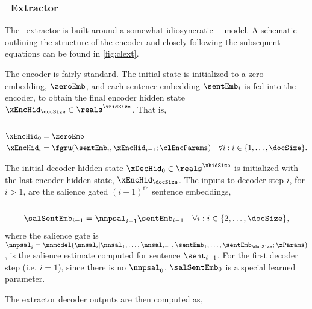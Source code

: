 

\subsubsection{\clext~Extractor}

The \clext~extractor \citep{cheng2016neural} is built around a somewhat
idiosyncratic \unidirectional~\sequencetosequence~model. A schematic outlining
the structure of the encoder and closely following the subsequent equations can
be found in \autoref{fig:clext}.

The encoder is fairly standard. The initial state is initialized to a zero
embedding, $\zeroEmb$, and each sentence embedding $\sentEmb_i$ is fed into the
encoder, to obtain the final encoder hidden state $\xEncHid_\docSize \in
\reals^\xhidSize$. That is,\\

\noindent{}\\[-40pt]
\begin{align}
    \xEncHid_0 & = \zeroEmb \\
    \xEncHid_i &= \fgru(\sentEmb_i, \xEncHid_{i-1};\clEncParams) & 
    \forall i : i \in \{1,\ldots,\docSize\}. 
\end{align}

The initial decoder hidden state $\xDecHid_0 \in \reals^{\xhidSize}$ is
initialized with the last encoder hidden state, $\xEncHid_\docSize$.  The
inputs to decoder step $i$, for $i >1$, are the salience gated
$(i-1)^\textrm{th}$ sentence embeddings,\\

\noindent{}\\[-40pt]
\begin{align}
    \salSentEmb_{i-1} & = \nnpsal_{i-1}\sentEmb_{i-1} &
    \forall i: i \in \{2,\dots,\docSize\},
\end{align}
where the salience gate is $\nnpsal_i =
\nnmodel(\nnsal_i|\nnsal_1,\ldots,\nnsal_{i-1},
\sentEmb_1,\ldots,\sentEmb_\docSize;\xParams)$, is the salience estimate
computed for sentence $\sent_{i-1}$.  For the first decoder step (i.e. $i=1$),
since there is no $\nnpsal_0$, $\salSentEmb_0$ is a special learned parameter.

The extractor decoder outputs are then computed as,\\

